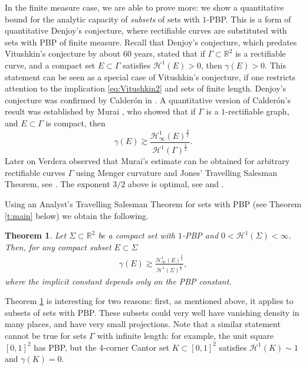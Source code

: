 \documentclass[11pt,reqno]{amsart}
\newtheorem{theorem}{Theorem}[section]
\theoremstyle{definition}
\theoremstyle{remark}
\numberwithin{equation}{section}
\newcommand{\R}{\mathbb{R}}
\theoremstyle{theorem}
\theoremstyle{definition}
\theoremstyle{remark}
\numberwithin{equation}{section}
\begin{document}
		In the finite measure case, we are able to prove more: we show a quantitative bound for the analytic capacity of \textit{subsets} of sets with $1$-PBP. This is a form of quantitative Denjoy's conjecture, where rectifiable curves are substituted with sets with PBP of finite measure. Recall that Denjoy's conjecture, which predates Vitushkin's conjecture by about 60 years, stated that if $\Gamma\subset\R^2$ is a rectifiable curve, and a compact set $E\subset\Gamma$ satisfies $\mathcal{H}^1(E)>0$, then $\gamma(E)>0$. This statement can be seen as a special case of Vitushkin's conjecture, if one restricts attention to the implication \eqref{eq:Vitushkin2} and sets of finite length. Denjoy's conjecture was confirmed by Calderón in \cite{calderon1977cauchy}. A quantitative version of Calderón's result was established by Murai \cite{murai1987comparison}, who showed that if $\Gamma$ is a $1$-rectifiable graph, and $E\subset\Gamma$ is compact, then 
		\begin{equation*}
			\gamma(E)\gtrsim \frac{\mathcal{H}^1_\infty(E)^{\frac{3}{2}}}{\mathcal{H}^1(\Gamma)^{\frac{1}{2}}}.
		\end{equation*}
		Later on Verdera observed that Murai's estimate can be obtained for arbitrary rectifiable curves $\Gamma$ using Menger curvature and Jones' Travelling Salesman Theorem, see \cite[Theorem 4.31]{tolsa2014analytic}. The exponent $3/2$ above is optimal, see \cite{murai1990power} and \cite[\S 4.8]{tolsa2014analytic}.
		
		Using an Analyst's Travelling Salesman Theorem for sets with PBP (see Theorem \ref{t:main} below) we obtain the following.
	
\begin{theorem}\label{t:corollary-2}
	Let $\Sigma \subset \R^2$ be a compact set with $1$-PBP and $0<\mathcal{H}^1(\Sigma)<\infty$. Then, for any compact subset $E \subset \Sigma$
	\begin{align*}
		\gamma(E) \gtrsim \frac{\mathcal{H}^1_\infty(E)^{\frac{3}{2}}}{\mathcal{H}^1(\Sigma)^{\frac{1}{2}}},
	\end{align*}
	where the implicit constant depends only on the PBP constant.
\end{theorem}
\noindent

Theorem \ref{t:corollary-2} is interesting for two reasons: first, as mentioned above, it applies to subsets of sets with PBP. These subsets could very well have vanishing density in many places, and have very small projections. Note that a similar statement cannot be true for sets $\Gamma$ with infinite length: for example, the unit square $[0,1]^2$ has PBP, but the 4-corner Cantor set $K\subset[0,1]^2$ satisfies $\mathcal{H}^1(K)\sim 1$ and $\gamma(K)=0$.
\end{document}
